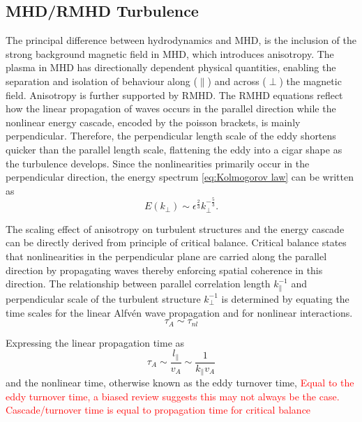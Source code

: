\subsection{MHD/RMHD Turbulence}
The principal difference between hydrodynamics and MHD, is the inclusion of the strong background magnetic field in MHD, which introduces anisotropy. The plasma in MHD has directionally dependent physical quantities, enabling the separation and isolation of behaviour along (\(\parallel\)) and across (\(\perp\)) the magnetic field. Anisotropy is further supported by RMHD. The RMHD equations reflect how the linear propagation of waves occurs in the parallel direction while the nonlinear energy cascade, encoded by the poisson brackets, is mainly perpendicular. Therefore, the perpendicular length scale of the eddy shortens quicker than the parallel length scale, flattening the eddy into a cigar shape  as the turbulence develops. Since the nonlinearities primarily occur in the perpendicular direction, the energy spectrum \eqref{eq:Kolmogorov law} can be written as
\begin{equation}
   E(k_{\perp}) \sim \epsilon^\frac{2}{3}k_{\perp}^{-\frac{5}{3}}.
   \label{eq:Energy spectra perp}
\end{equation}

The scaling effect of anisotropy on turbulent structures and the energy cascade can be directly derived from principle of critical balance. Critical balance states that nonlinearities in the perpendicular plane are carried along the parallel direction by propagating waves thereby enforcing spatial coherence in this direction. The relationship between parallel correlation length \(k^{-1}_{\parallel}\) and perpendicular scale of the turbulent structure \(k^{-1}_{\perp}\) is determined by equating the time scales for the linear Alfv\'en wave propagation and for nonlinear interactions. 
\begin{equation*}
    \tau_A \sim\tau_{nl}
\end{equation*}

Expressing the linear propagation time as 
\begin{equation*}
    \tau_A \sim \frac{l_{\parallel}}{v_A} \sim \frac{1}{k_{\parallel}v_A} 
\end{equation*}
and the nonlinear time, otherwise known as the eddy turnover time,
\textcolor{red}{Equal to the eddy turnover time, a biased review suggests this may not always be the case. Cascade/turnover time is equal to propagation time for critical balance}

